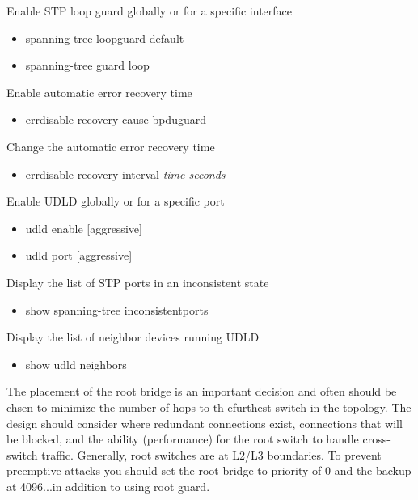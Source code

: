 \documentclass{article}
\begin{document}
Enable STP loop guard globally or for a specific interface
\begin{itemize}
\item spanning-tree loopguard default
\item spanning-tree guard loop
\end{itemize}

Enable automatic error recovery time
\begin{itemize}
\item errdisable recovery cause bpduguard
\end{itemize}

Change the automatic error recovery time
\begin{itemize}
\item errdisable recovery interval \textit{time-seconds}
\end{itemize}

Enable UDLD globally or for a specific port
\begin{itemize}
\item udld enable [aggressive]
\item udld port [aggressive]
\end{itemize}

Display the list of STP ports in an inconsistent state
\begin{itemize}
\item show spanning-tree inconsistentports
\end{itemize}

Display the list of neighbor devices running UDLD
\begin{itemize}
\item show udld neighbors
\end{itemize}

The placement of the root bridge is an important decision and often should be chsen to minimize the number of hops to th efurthest switch in the topology. The design should consider where redundant connections exist, connections that will be blocked, and the ability (performance) for the root switch to handle cross-switch traffic. Generally, root switches are at L2/L3 boundaries. To prevent preemptive attacks you should set the root bridge to priority of 0 and the backup at 4096...in addition to using root guard.\\
\end{document}
